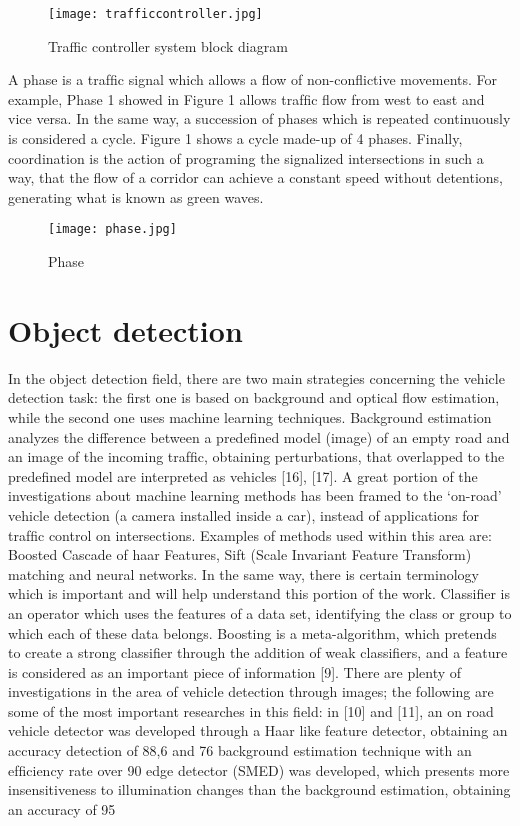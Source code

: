 \documentclass{SureshLimkar}
\begin{document}
\begin{figure}[h]%
\centering
\texttt{[image: trafficcontroller.jpg]}%
\caption{Traffic controller system block diagram}%
\label{Traffic Controller system}%
\end{figure}


\hspace {0.5 in}A phase is a trafﬁc signal
which allows a ﬂow of non-conﬂictive movements. For example, Phase 1 showed in Figure 1 allows trafﬁc ﬂow from west
to east and vice versa. In the same way, a succession of phases
which is repeated continuously is considered a cycle. Figure
1 shows a cycle made-up of 4 phases. Finally, coordination is
the action of programing the signalized intersections in such a
way, that the ﬂow of a corridor can achieve a constant speed
without detentions, generating what is known as green waves.

\begin{figure}[h]%
\centering
 \texttt{[image: phase.jpg]}%
\caption{Phase}%
\label{Phases in traffic system}%
\end{figure}

\section{Object detection}
\hspace{0.5 in}In the object detection ﬁeld, there are two main strategies
concerning the vehicle detection task: the ﬁrst one is based
on background and optical ﬂow estimation, while the second
one uses machine learning techniques. Background estimation
analyzes the difference between a predeﬁned model (image)
of an empty road and an image of the incoming trafﬁc,
obtaining perturbations, that overlapped to the predeﬁned
model are interpreted as vehicles [16], [17]. A great portion
of the investigations about machine learning methods has been
framed to the ‘on-road’ vehicle detection (a camera installed
inside a car), instead of applications for trafﬁc control on
intersections. Examples of methods used within this area are:
Boosted Cascade of haar Features, Sift (Scale Invariant Feature
Transform) matching and neural networks.
In the same way, there is certain terminology which is
important and will help understand this portion of the work.
Classiﬁer is an operator which uses the features of a data
set, identifying the class or group to which each of these
data belongs. Boosting is a meta-algorithm, which pretends
to create a strong classiﬁer through the addition of weak
classiﬁers, and a feature is considered as an important piece
of information [9].
There are plenty of investigations in the area of vehicle
detection through images; the following are some of the most
important researches in this ﬁeld: in [10] and [11], an on
road vehicle detector was developed through a Haar like
feature detector, obtaining an accuracy detection of 88,6%
and 76%
background estimation technique with an efﬁciency rate over
90%
edge detector (SMED) was developed, which presents more
insensitiveness to illumination changes than the background
estimation, obtaining an accuracy of 95%
\end{document}

